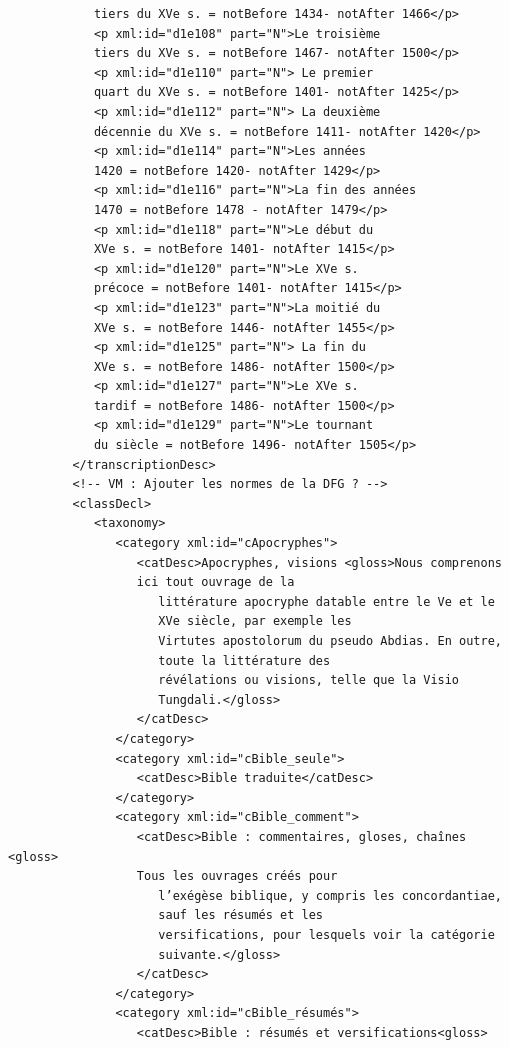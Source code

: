 \documentclass[a4paper,12pt,twoside]{book}
\begin{document}
\begin{verbatim}
            tiers du XVe s. = notBefore 1434- notAfter 1466</p>
            <p xml:id="d1e108" part="N">Le troisième 
            tiers du XVe s. = notBefore 1467- notAfter 1500</p>
            <p xml:id="d1e110" part="N"> Le premier 
            quart du XVe s. = notBefore 1401- notAfter 1425</p>
            <p xml:id="d1e112" part="N"> La deuxième 
            décennie du XVe s. = notBefore 1411- notAfter 1420</p>
            <p xml:id="d1e114" part="N">Les années 
            1420 = notBefore 1420- notAfter 1429</p>
            <p xml:id="d1e116" part="N">La fin des années 
            1470 = notBefore 1478 - notAfter 1479</p>
            <p xml:id="d1e118" part="N">Le début du 
            XVe s. = notBefore 1401- notAfter 1415</p>
            <p xml:id="d1e120" part="N">Le XVe s. 
            précoce = notBefore 1401- notAfter 1415</p>
            <p xml:id="d1e123" part="N">La moitié du 
            XVe s. = notBefore 1446- notAfter 1455</p>
            <p xml:id="d1e125" part="N"> La fin du 
            XVe s. = notBefore 1486- notAfter 1500</p>
            <p xml:id="d1e127" part="N">Le XVe s. 
            tardif = notBefore 1486- notAfter 1500</p>
            <p xml:id="d1e129" part="N">Le tournant 
            du siècle = notBefore 1496- notAfter 1505</p>
         </transcriptionDesc>
         <!-- VM : Ajouter les normes de la DFG ? -->
         <classDecl>
            <taxonomy>
               <category xml:id="cApocryphes">
                  <catDesc>Apocryphes, visions <gloss>Nous comprenons 
                  ici tout ouvrage de la
                     littérature apocryphe datable entre le Ve et le 
                     XVe siècle, par exemple les
                     Virtutes apostolorum du pseudo Abdias. En outre, 
                     toute la littérature des
                     révélations ou visions, telle que la Visio 
                     Tungdali.</gloss>
                  </catDesc>
               </category>
               <category xml:id="cBible_seule">
                  <catDesc>Bible traduite</catDesc>
               </category>
               <category xml:id="cBible_comment">
                  <catDesc>Bible : commentaires, gloses, chaînes <gloss>
                  Tous les ouvrages créés pour
                     l’exégèse biblique, y compris les concordantiae, 
                     sauf les résumés et les
                     versifications, pour lesquels voir la catégorie 
                     suivante.</gloss>
                  </catDesc>
               </category>
               <category xml:id="cBible_résumés">
                  <catDesc>Bible : résumés et versifications<gloss>

\end{verbatim}
\end{document}
